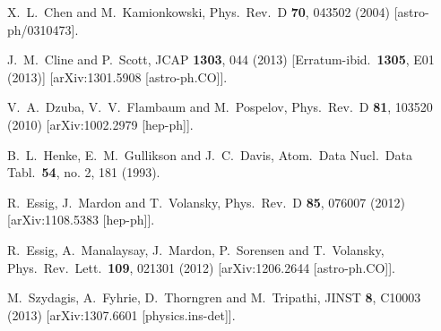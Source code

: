 \documentclass[prd,reprint,nofootinbib,notitlepage,aps,tightenlines,preprintnumbers,amsmath,amssymb,showpacs,superscriptaddress]{revtex4-1}
\begin{document}
\begin{thebibliography}{99}
  X.~L.~Chen and M.~Kamionkowski,
  Phys.\ Rev.\ D {\bf 70}, 043502 (2004)
  [astro-ph/0310473].

  J.~M.~Cline and P.~Scott,
  JCAP {\bf 1303}, 044 (2013)
  [Erratum-ibid.\  {\bf 1305}, E01 (2013)]
  [arXiv:1301.5908 [astro-ph.CO]].


  V.~A.~Dzuba, V.~V.~Flambaum and M.~Pospelov,
  Phys.\ Rev.\ D {\bf 81}, 103520 (2010)
  [arXiv:1002.2979 [hep-ph]].

%


  B.~L.~Henke, E.~M.~Gullikson and J.~C.~Davis,
  Atom.\ Data Nucl.\ Data Tabl.\  {\bf 54}, no. 2, 181 (1993).

  R.~Essig, J.~Mardon and T.~Volansky,
  Phys.\ Rev.\ D {\bf 85}, 076007 (2012)
  [arXiv:1108.5383 [hep-ph]].

  R.~Essig, A.~Manalaysay, J.~Mardon, P.~Sorensen and T.~Volansky,
  Phys.\ Rev.\ Lett.\  {\bf 109}, 021301 (2012)
  [arXiv:1206.2644 [astro-ph.CO]].

  M.~Szydagis, A.~Fyhrie, D.~Thorngren and M.~Tripathi,
  JINST {\bf 8}, C10003 (2013)
  [arXiv:1307.6601 [physics.ins-det]].

  

\end{thebibliography}
\end{document}
